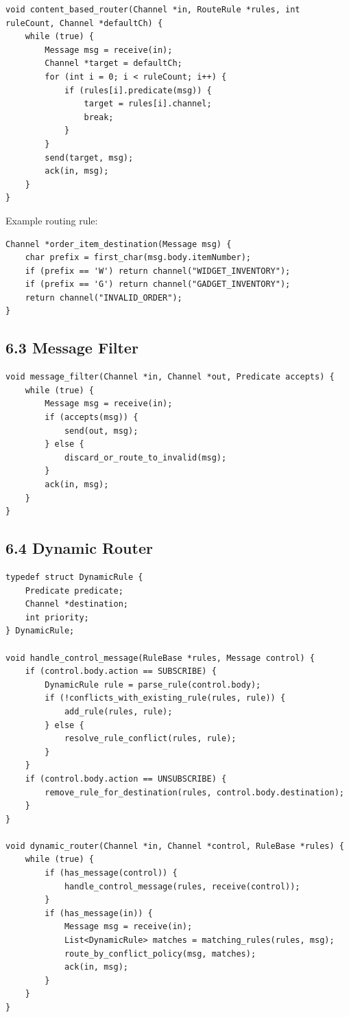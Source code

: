 \documentclass[11pt]{article}
\begin{document}
\begin{verbatim}
void content_based_router(Channel *in, RouteRule *rules, int ruleCount, Channel *defaultCh) {
    while (true) {
        Message msg = receive(in);
        Channel *target = defaultCh;
        for (int i = 0; i < ruleCount; i++) {
            if (rules[i].predicate(msg)) {
                target = rules[i].channel;
                break;
            }
        }
        send(target, msg);
        ack(in, msg);
    }
}
\end{verbatim}

Example routing rule:

\begin{verbatim}
Channel *order_item_destination(Message msg) {
    char prefix = first_char(msg.body.itemNumber);
    if (prefix == 'W') return channel("WIDGET_INVENTORY");
    if (prefix == 'G') return channel("GADGET_INVENTORY");
    return channel("INVALID_ORDER");
}
\end{verbatim}

\subsection{6.3 Message Filter}\label{message-filter}

\begin{verbatim}
void message_filter(Channel *in, Channel *out, Predicate accepts) {
    while (true) {
        Message msg = receive(in);
        if (accepts(msg)) {
            send(out, msg);
        } else {
            discard_or_route_to_invalid(msg);
        }
        ack(in, msg);
    }
}
\end{verbatim}

\subsection{6.4 Dynamic Router}\label{dynamic-router}

\begin{verbatim}
typedef struct DynamicRule {
    Predicate predicate;
    Channel *destination;
    int priority;
} DynamicRule;

void handle_control_message(RuleBase *rules, Message control) {
    if (control.body.action == SUBSCRIBE) {
        DynamicRule rule = parse_rule(control.body);
        if (!conflicts_with_existing_rule(rules, rule)) {
            add_rule(rules, rule);
        } else {
            resolve_rule_conflict(rules, rule);
        }
    }
    if (control.body.action == UNSUBSCRIBE) {
        remove_rule_for_destination(rules, control.body.destination);
    }
}

void dynamic_router(Channel *in, Channel *control, RuleBase *rules) {
    while (true) {
        if (has_message(control)) {
            handle_control_message(rules, receive(control));
        }
        if (has_message(in)) {
            Message msg = receive(in);
            List<DynamicRule> matches = matching_rules(rules, msg);
            route_by_conflict_policy(msg, matches);
            ack(in, msg);
        }
    }
}
\end{verbatim}
\end{document}
